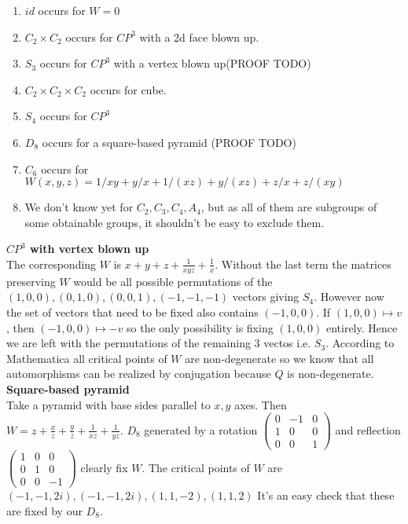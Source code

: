 \documentclass[a4paper]{article}
\begin{document}
\begin{enumerate}
	\item $id$ occurs for $W = 0$
	\item $C_2 \times C_2$ occurs for $CP^3$ with a 2d face blown up.
	\item $S_3$ occurs for $CP^3$ with a vertex blown up(PROOF TODO)
	\item $C_2 \times C_2 \times C_2$ occurs for cube.
	\item $S_4$ occurs for $CP^3$
	\item $D_8$ occurs for a square-based pyramid (PROOF TODO)
	\item $C_6$ occurs for $W(x,y,z)= 1/x y+y/x+1/(x z)+y/(x z)+ z/x+z/(x y)$
	\item We don't know yet for $C_2, C_3, C_4, A_4$, but as all of them are subgroups of some obtainable groups, it shouldn't be easy to exclude them.
\end{enumerate}
\textbf{$CP^3$ with vertex blown up}\\
The corresponding $W$ is $x+y+z+\frac{1}{xyz}+\frac{1}{x}$. Without the last term the matrices preserving $W$ would be all possible permutations of the $(1,0,0),(0,1,0),(0,0,1),(-1,-1,-1)$ vectors giving $S_4$. However now the set of vectors that need to be fixed also contains $(-1,0,0)$. If $(1,0,0)\mapsto v$, then $(-1,0,0)\mapsto -v$ so the only possibility is fixing $(1,0,0)$ entirely. Hence we are left with the permutations of the remaining 3 vectos i.e. $S_3$. According to Mathematica all critical points of $W$ are non-degenerate so we know that all automorphisms can be realized by conjugation because $Q$ is non-degenerate.
\\
 \textbf{Square-based pyramid}\\
 Take a pyramid with base sides parallel to $x,y$ axes. Then $W=z+\frac{x}{z}+\frac{y}{z}+\frac{1}{xz}+\frac{1}{yz}$. $D_8$ generated by a rotation  $\begin{pmatrix} 0 & -1 &0\\ 1 & 0 & 0\\ 0& 0 &1 \end{pmatrix} $ and reflection $\begin{pmatrix} 1 & 0 & 0 \\ 0 & 1 & 0\\ 0 & 0 &-1 \end{pmatrix} $ clearly fix $W$. The critical points of $W$ are $\left( -1,-1,2i \right) ,\left( -1,-1,2i \right), \left( 1,1,-2 \right),\left( 1,1,2 \right) $ 
 It's an easy check that these are fixed by our $D_8$.\\
\end{document}

